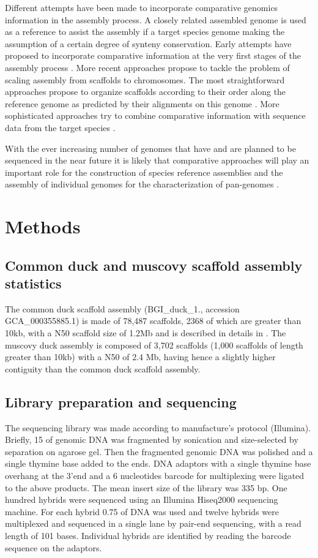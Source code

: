 \documentclass[10pt,letterpaper]{article}
\begin{document}
Different attempts have been made to incorporate comparative genomics information in the assembly process. A closely related assembled genome is used as a reference to assist the assembly if a target species genome making the assumption of a certain degree of synteny conservation. 
Early attempts have proposed to incorporate comparative information at the very first stages of the assembly process \cite{Gnerre2009a,Schneeberger2011a,Lischer2017a}. 
More recent approaches propose to tackle the problem of scaling assembly from scaffolds to chromosomes. 
The most straightforward approaches propose to organize scaffolds according to their order along the reference genome as predicted by their alignments on this genome \cite{Chakraborty2018a}. 
More sophisticated approaches try to combine comparative information with sequence data from the target species \cite{Kim2013a,Damas2017a,Kolmogorov2018a}. 

With the ever increasing number of genomes that have and are planned to be sequenced in the near future \cite{Lewin2018} it is likely that comparative approaches will play an important role for the construction of species reference assemblies and the assembly of individual genomes for the characterization of pan-genomes \cite{Gordon2017a,Sherman2019a}.

\section*{Methods}

\subsection*{Common duck and muscovy scaffold assembly statistics}

The common duck scaffold assembly (BGI\_duck\_1., accession GCA\_000355885.1)
is made of 78,487 scaffolds, 2368 of which are greater than 10kb, with a N50 scaffold size of 1.2Mb and is described in details in \cite{Huang2013}. 
The muscovy duck assembly is composed of 3,702 scaffolds (1,000 scaffolds of length greater than 10kb) with a N50 of 2.4 Mb, having hence a slightly higher contiguity than the common duck scaffold assembly.

\subsection*{Library preparation and sequencing}
The sequencing library was made according to manufacture’s protocol (Illumina). Briefly, 1\unit{5}{\micro\gram} of genomic DNA was fragmented by sonication and size-selected by separation on agarose gel. Then the fragmented genomic DNA was polished and a single thymine base added to the ends. DNA adaptors with a single thymine base overhang at the 3’end and a 6 nucleotides barcode for multiplexing were ligated to the above products. The mean insert size of the library was 335 bp. 
One hundred hybrids were sequenced using an Illumina Hiseq2000 sequencing machine.  For each hybrid 0.7\unit{5}{\pico\gram} of DNA was used and twelve hybrids were multiplexed and sequenced in a single lane by pair-end sequencing, with a read length of 101 bases. Individual hybrids are identified by reading the barcode sequence on the adaptors.
\end{document}
